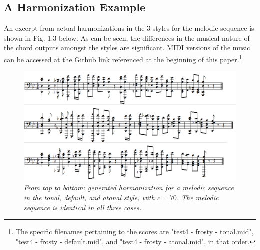 \documentclass[twoside]{article}
\begin{document}
	\subsection{A Harmonization Example}
	An excerpt from actual harmonizations in the 3 styles for the melodic sequence is shown in Fig. 1.3 below. As can be seen, the differences in the musical nature of the chord outputs amongst the styles are significant. MIDI versions of the music can be accessed at the Github link referenced at the beginning of this paper.\footnote{The specific filenames pertaining to the scores are "test4 - frosty - tonal.mid", "test4 - frosty - default.mid", and "test4 - frosty - atonal.mid", in that order.}
	\begin{figure}[h]  %
		\begin{center}  
			\includegraphics[scale=0.8]{Fig1_3.png}  
			\caption{\small \sl From top to bottom: generated harmonization for a melodic sequence in the tonal, default, and atonal style, with $c=70$. The melodic sequence is identical in all three cases.}
		\end{center}  
	\end{figure}
\end{document}
